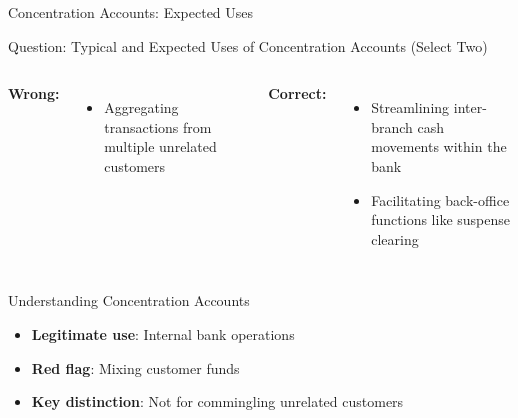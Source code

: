 \documentclass{beamer}
\begin{document}
\begin{frame}{Concentration Accounts: Expected Uses}
\begin{block}{Question: Typical and Expected Uses of Concentration Accounts (Select Two)}
\end{block}

\begin{columns}
\textcolor{wrong}{\textbf{ Wrong:}}
\begin{itemize}
    \item Aggregating transactions from multiple unrelated customers
\end{itemize}

\textcolor{correct}{\textbf{Correct:}}
\begin{itemize}
    \item Streamlining inter-branch cash movements within the bank
    \item Facilitating back-office functions like suspense clearing
\end{itemize}
\end{columns}

\vspace{0.3cm}
\begin{block}{Understanding Concentration Accounts}
\begin{itemize}
    \item \textbf{Legitimate use}: Internal bank operations
    \item \textbf{Red flag}: Mixing customer funds
    \item \textbf{Key distinction}: Not for commingling unrelated customers
\end{itemize}
\end{block}
\end{frame}

\end{document}
